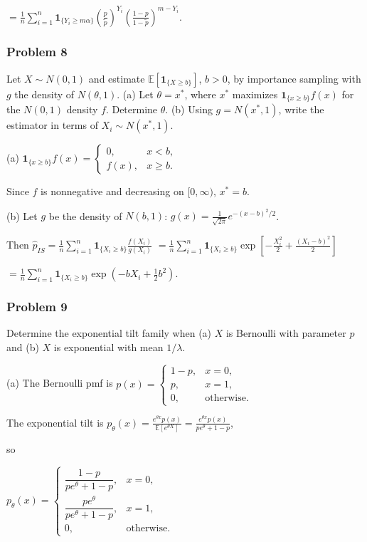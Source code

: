 $=\frac1n\sum_{i=1}^n\mathbf1_{\{Y_i\geq m\alpha\}}\left(\frac p{\widetilde p}\right)^{Y_i}\left(\frac{1-p}{1-\widetilde p}\right)^{m-Y_i}$.

\subsubsection*{Problem 8}

 Let $X\sim N(0,1)$ and estimate $\mathbb{E}[\mathbf1_{\{X\geq b\}}]$, $b>0$, by importance sampling with $g$ the density of $N(\theta,1)$. (a) Let $\theta=x^*$, where $x^*$ maximizes $\mathbf1_{\{x\geq b\}}f(x)$ for the $N(0,1)$ density $f$. Determine $\theta$. (b) Using $g=N(x^*,1)$, write the estimator in terms of $X_i\sim N(x^*,1)$.

 (a)
$\mathbf1_{\{x\geq b\}}f(x)=\begin{cases}0,&x<b,\\f(x),&x\geq b.\end{cases}$

Since $f$ is nonnegative and decreasing on $[0,\infty)$, $x^*=b$.

(b) Let $g$ be the density of $N(b,1)$:
$g(x)=\frac1{\sqrt{2\pi}}e^{-(x-b)^2/2}$.

Then
$\widehat p_{IS}=\frac1n\sum_{i=1}^n\mathbf1_{\{X_i\geq b\}}\frac{f(X_i)}{g(X_i)}$
$=\frac1n\sum_{i=1}^n\mathbf1_{\{X_i\geq b\}}\exp\left[-\frac{X_i^2}{2}+\frac{(X_i-b)^2}{2}\right]$

$=\frac1n\sum_{i=1}^n\mathbf1_{\{X_i\geq b\}}\exp\left(-bX_i+\frac12b^2\right)$.

\subsubsection*{Problem 9}

 Determine the exponential tilt family when (a) $X$ is Bernoulli with parameter $p$ and (b) $X$ is exponential with mean $1/\lambda$.

 (a) The Bernoulli pmf is
$p(x)=\begin{cases}1-p,&x=0,\\p,&x=1,\\0,&\text{otherwise}.\end{cases}$

The exponential tilt is
$p_\theta(x)=\frac{e^{\theta x}p(x)}{\mathbb{E}[e^{\theta X}]}=\frac{e^{\theta x}p(x)}{pe^\theta+1-p}$,

so

$p_\theta(x)=\begin{cases}\dfrac{1-p}{pe^\theta+1-p},&x=0,\\\dfrac{pe^\theta}{pe^\theta+1-p},&x=1,\\0,&\text{otherwise}.\end{cases}$

